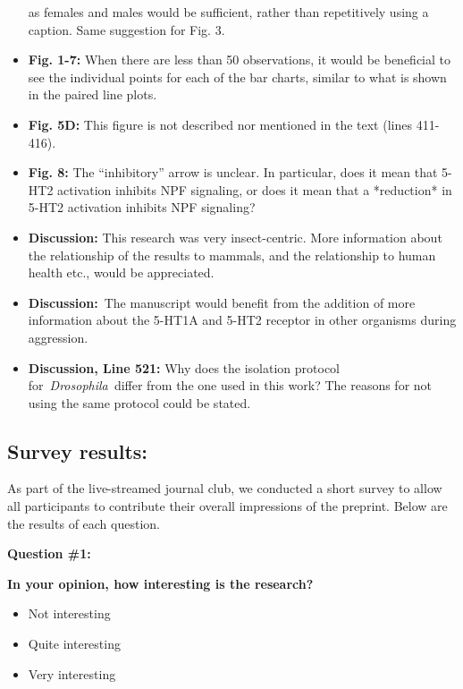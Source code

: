 \documentclass[10pt]{article}
\providecommand{\tightlist}{\setlength{\itemsep}{0pt}\setlength{\parskip}{0pt}}%
\begin{document}
\begin{itemize}
  as females and males would be sufficient, rather than repetitively
  using a caption. Same suggestion for Fig. 3.
\item
  \textbf{Fig. 1-7:} When there are less than 50 observations, it would
  be beneficial to see the individual points for each of the bar charts,
  similar to what is shown in the paired line plots.
\item
  \textbf{Fig. 5D:} This figure is not described nor mentioned in the
  text (lines 411-416).
\item
  \textbf{Fig. 8:} The ``inhibitory'' arrow is unclear. In particular,
  does it mean that 5-HT2 activation inhibits NPF signaling, or does it
  mean that a *reduction* in 5-HT2 activation inhibits NPF signaling?
\item
  \textbf{Discussion:} This research was very insect-centric. More
  information about the relationship of the results to mammals, and the
  relationship to human health etc., would be appreciated.
\item
  \textbf{Discussion:}~The manuscript would benefit from the addition of
  more information about the 5-HT1A and 5-HT2 receptor in other
  organisms during aggression.
\item
  \textbf{Discussion, Line 521:} Why does the isolation protocol
  for~\emph{Drosophila~}differ from the one used in this work? The
  reasons for not using the same protocol could be stated.
\end{itemize}

\par\null

\subsection*{Survey results:~}

{\label{292154}}

As part of the live-streamed journal club, we conducted a short survey
to allow all participants to contribute their overall impressions of the
preprint. Below are the results of each question.

\par\null

\textbf{Question \#1:}

\textbf{In your opinion, how interesting is the research?}

\begin{itemize}
\tightlist
\item
  \textbf{} Not interesting
\item
  Quite interesting
\item
  Very interesting
\end{itemize}
\end{document}
